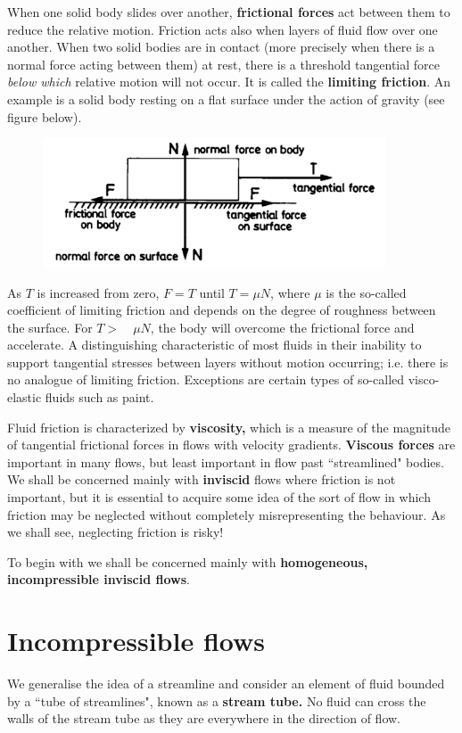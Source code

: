 \documentclass[twoside,a4paper,11pt]{report}
\begin{document}
When one solid body slides over another, \textbf{frictional forces} act 
between them to reduce the relative motion. Friction acts also when layers 
of fluid flow over one another. When two solid bodies are in contact (more 
precisely when there is a normal force acting between them) at rest, there 
is a threshold tangential force \textit{below which} relative motion will not occur. It is 
called the \textbf{limiting friction}. An example is a solid body resting on 
a flat surface under the action of gravity (see figure below).

\begin{figure}[htbp]
\centerline{\includegraphics[width=4in]{Section5.pdf}}
\label{fig5}
\end{figure}

As $T$ is increased from zero, $F = T$ until $T = \mu N$, where $\mu $ is the 
so-called coefficient of limiting friction and depends on the degree of roughness 
between the surface. For $T > \quad \mu N$, the body will overcome the 
frictional force and accelerate. A distinguishing characteristic of most 
fluids in their inability to support tangential stresses between layers 
without motion occurring; i.e. there is no analogue of limiting friction. 
Exceptions are certain types of so-called visco-elastic fluids such as 
paint.

Fluid friction is characterized by \textbf{viscosity,} which is a measure of 
the magnitude of tangential frictional forces in flows with velocity 
gradients. \textbf{Viscous forces} are important in many flows, but least 
important in flow past ``streamlined" bodies. We shall be concerned mainly 
with \textbf{inviscid} flows where friction is not important, but it is 
essential to acquire some idea of the sort of flow in which friction may be 
neglected without completely misrepresenting the behaviour. As we shall see, 
neglecting friction is risky!

To begin with we shall be concerned mainly with \textbf{homogeneous, 
incompressible inviscid flows}.

\section{Incompressible flows}
We generalise the idea of a streamline and consider an element of fluid 
bounded by a ``tube of streamlines", known as a \textbf{stream tube.} No 
fluid can cross the walls of the stream tube as they are everywhere in the 
direction of flow.
\end{document}
